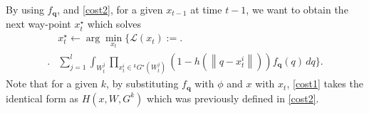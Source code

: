 \documentclass[letterpaper, 10 pt, conference]{ieeeconf}
\begin{document}
 By using $f_{\bm{q}}$, and \eqref{cost2}, for a given $x_{t-1}$ at time $t-1$, we want to obtain the next way-point $x_t^{\star}$ which solves
\begin{align}
&x_{t}^{\star} \gets \arg\min_{x_{t}}\Biggl\{\mathcal{L}(x_{t}):=\Biggr.
\nonumber \\
\Biggl.& \sum_{j = 1}^l \int_{W_t^j} \prod_{x_{t}^i \in {}^kG^{\star}(W_t^j)} \left(1- h \left(\left\|
q - x_t^i \right\|  \right) \right){f}_{\bm{q}}(q)\,dq \Biggr\}.
\label{cost1}
\end{align}
Note that for a given $k$, by substituting ${f}_{\bm{q}}$ with $\phi$ and $x$ with $x_t$,  \eqref{cost1} takes the identical form as $H(x,W,G^k)$ which was previously defined in \eqref{cost2}.
\end{document}
